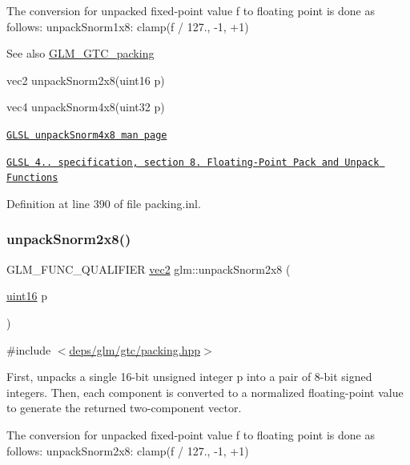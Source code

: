 The conversion for unpacked fixed-\/point value f to floating point is done as follows\+: unpack\+Snorm1x8\+: clamp(f / 127., -\/1, +1)

\begin{DoxySeeAlso}{See also}
\hyperlink{group__gtc__packing}{G\+L\+M\+\_\+\+G\+T\+C\+\_\+packing} 

vec2 unpack\+Snorm2x8(uint16 p) 

vec4 unpack\+Snorm4x8(uint32 p) 

\href{http://www.opengl.org/sdk/docs/manglsl/xhtml/unpackSnorm4x8.xml}{\tt G\+L\+SL unpack\+Snorm4x8 man page} 

\href{http://www.opengl.org/registry/doc/GLSLangSpec.4.20.8.pdf}{\tt G\+L\+SL 4.. specification, section 8. Floating-\/\+Point Pack and Unpack Functions} 
\end{DoxySeeAlso}


Definition at line 390 of file packing.\+inl.

\mbox{\label{group__gtc__packing_ga27f30f0281b88e152b0895f5e2ead878}} 
\subsubsection{\texorpdfstring{unpack\+Snorm2x8()}{unpackSnorm2x8()}}
{\footnotesize\ttfamily G\+L\+M\+\_\+\+F\+U\+N\+C\+\_\+\+Q\+U\+A\+L\+I\+F\+I\+ER \hyperlink{group__core__types_gaa1618f51db67eaa145db101d8c8431d8}{vec2} glm\+::unpack\+Snorm2x8 (\begin{DoxyParamCaption}\item[{\hyperlink{group__gtc__type__precision_gad8c2939e1fdd8e5828b31d95c52255d5}{uint16}}]{p }\end{DoxyParamCaption})}



{\ttfamily \#include $<$\hyperlink{gtc_2packing_8hpp}{deps/glm/gtc/packing.\+hpp}$>$}

First, unpacks a single 16-\/bit unsigned integer p into a pair of 8-\/bit signed integers. Then, each component is converted to a normalized floating-\/point value to generate the returned two-\/component vector.

The conversion for unpacked fixed-\/point value f to floating point is done as follows\+: unpack\+Snorm2x8\+: clamp(f / 127., -\/1, +1)

